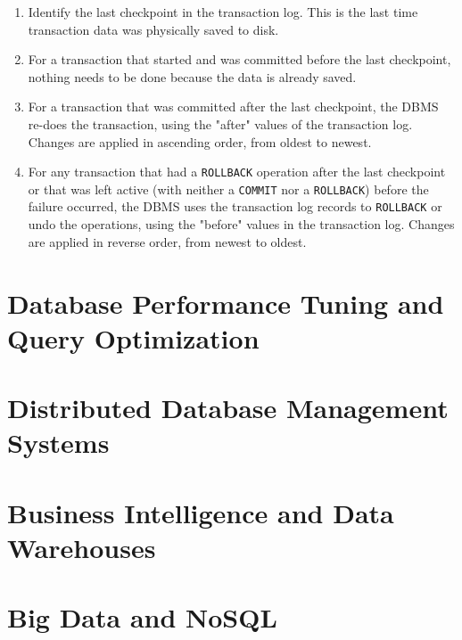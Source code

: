 \documentclass[a4paper, 11pt, titlepage]{report}
\begin{document}
\begin{enumerate}
\item Identify the last checkpoint in the transaction log. This is the last time transaction
data was physically saved to disk.
\item For a transaction that started and was committed before the last checkpoint, nothing
needs to be done because the data is already saved.
\item For a transaction that was committed after the last checkpoint, the DBMS re-does
the transaction, using the "after" values of the transaction log. Changes are applied in
ascending order, from oldest to newest.
\item For any transaction that had a \texttt{ROLLBACK} operation after the last checkpoint or that was left active (with neither a \texttt{COMMIT} nor a \texttt{ROLLBACK}) before the failure occurred, the DBMS uses the transaction log records to \texttt{ROLLBACK} or undo the operations, using the "before" values in the transaction log. Changes are applied in reverse order, from newest to oldest.
\end{enumerate}
\chapter{Database Performance Tuning and Query Optimization}
\chapter{Distributed Database Management Systems}
\chapter{Business Intelligence and Data Warehouses}
\chapter{Big Data and NoSQL}
\end{document}
